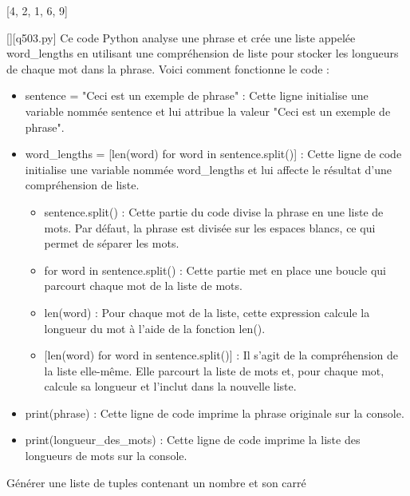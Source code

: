[4, 2, 1, 6, 9]
        \par
        \begin{solution}
            \renewcommand{\nomfichier}{q503.py}
            \pythonfile{\chemincode \nomfichier}[][\nomfichier]
            Ce code Python analyse une phrase et crée une liste appelée word\_lengths en utilisant une compréhension de liste pour stocker les longueurs de chaque mot dans la phrase. Voici comment fonctionne le code :\par

\begin{itemize}
\item     sentence = "Ceci est un exemple de phrase" : Cette ligne initialise une variable nommée sentence et lui attribue la valeur "Ceci est un exemple de phrase".
\item     word\_lengths = [len(word) for word in sentence.split()] : Cette ligne de code initialise une variable nommée word\_lengths et lui affecte le résultat d'une compréhension de liste.

\begin{itemize}
\item         sentence.split() : Cette partie du code divise la phrase en une liste de mots. Par défaut, la phrase est divisée sur les espaces blancs, ce qui permet de séparer les mots.
\item         for word in sentence.split() : Cette partie met en place une boucle qui parcourt chaque mot de la liste de mots.
\item         len(word) : Pour chaque mot de la liste, cette expression calcule la longueur du mot à l'aide de la fonction len().
\item{}         [len(word) for word in sentence.split()] : Il s'agit de la compréhension de la liste elle-même. Elle parcourt la liste de mots et, pour chaque mot, calcule sa longueur et l'inclut dans la nouvelle liste.
\end{itemize}
\item    print(phrase) : Cette ligne de code imprime la phrase originale sur la console.
\item    print(longueur\_des\_mots) : Cette ligne de code imprime la liste des longueurs de mots sur la console.
 \end{itemize}
        \end{solution}
        

        \question
        
        Générer une liste de tuples contenant un nombre et son carré

